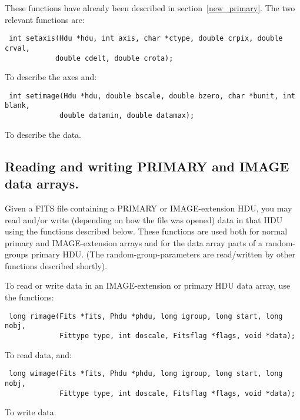 These functions have already been described in
section~\ref{new_primary}. The two relevant functions are:
\begin{verbatim}
 int setaxis(Hdu *hdu, int axis, char *ctype, double crpix, double crval,
            double cdelt, double crota);
\end{verbatim}
To describe the axes and:
\begin{verbatim}
 int setimage(Hdu *hdu, double bscale, double bzero, char *bunit, int blank,
             double datamin, double datamax);
\end{verbatim}
To describe the data.

\subsection{Reading and writing PRIMARY and IMAGE data arrays.}

Given a FITS file containing a PRIMARY or IMAGE-extension HDU, you
may read and/or write (depending on how the file was opened) data in
that HDU using the functions described below. These functions are used
both for normal primary and IMAGE-extension arrays and for the data
array parts of a random-groups primary HDU. (The
random-group-parameters are read/written by other functions described
shortly).

To read or write data in an IMAGE-extension or primary HDU data array, use
the functions:
\label{rimage}\begin{verbatim}
 long rimage(Fits *fits, Phdu *phdu, long igroup, long start, long nobj,
             Fittype type, int doscale, Fitsflag *flags, void *data);
\end{verbatim}
To read data, and:
\label{wimage}\begin{verbatim}
 long wimage(Fits *fits, Phdu *phdu, long igroup, long start, long nobj,
             Fittype type, int doscale, Fitsflag *flags, void *data);
\end{verbatim}
To write data.


